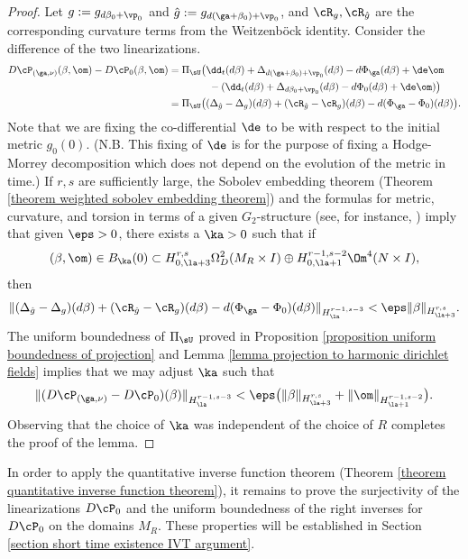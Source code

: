 \documentclass[hidelinks, 12pt, oneside, reqno]{amsart}
\begin{document}
\begin{proof}
Let $g := g_{d\beta_0 + \vp_0}$ and $\hat g := g_{d(\ga + \beta_0) + \vp_0}$, and $\cR_g, \cR_{\hat g}$ are the corresponding curvature terms from the Weitzenb\"ock identity. Consider the difference of the two linearizations. 
\begin{align*}
    D\cP_{(\ga, \nu)}(\beta,\om) -  D\cP_0(\beta,\om)&= \Pi_{\sU} \big( \dd_t (d\beta) + \Delta_{d(\ga + \beta_0) + \vp_0} (d\beta) - d\Phi_\ga (d\beta) + \de \om  \\
    &\qquad \qquad - (\dd_t (d\beta) + \Delta_{d\beta_0 + \vp_0} (d\beta) - d\Phi_0 (d\beta) + \de \om )  \big) \\
    &=  \Pi_{\sU} \big( (\Delta_{\hat g} - \Delta_{g}) (d\beta) + (\cR_{\hat g} - \cR_{g})(d\beta) - d(\Phi_\ga - \Phi_0) (d\beta) \big).  
\end{align*}
Note that we are fixing the co-differential $\de$ to be with respect to the initial metric $g_0(0)$. (N.B. This fixing of $\de$ is for the purpose of fixing a Hodge-Morrey decomposition which does not depend on the evolution of the metric in time.) If $r,s$ are sufficiently large, the Sobolev embedding theorem (Theorem \ref{theorem weighted sobolev embedding theorem}) and the formulas for metric, curvature, and torsion in terms of a given $G_2$-structure (see, for instance, \cite[\S 2]{LotayWeiLaplacianFlow}) imply that given $\eps > 0$, there exists a $\ka >0$ such that if 
\[
(\beta,\om) \in B_\ka(0) \subset H^{r,s}_{0, \la+3} \Omega^2_D (M_R \times I) \oplus H_{0,\la+1}^{r-1,s-2}\Om^4 (N \times I), 
\]
then 
\[
\|(\Delta_{\hat g} - \Delta_{g}) (d\beta) + (\cR_{\hat g} - \cR_{g})(d\beta) - d(\Phi_\ga - \Phi_0) (d\beta) \|_{H^{r-1,s-3}_\la} < \eps \|\beta\|_{H^{r,s}_{\la+3}}.
\]
The uniform boundedness of $\Pi_{\sU}$ proved in Proposition \ref{proposition uniform boundedness of projection} and Lemma \ref{lemma projection to harmonic dirichlet fields} implies that we may adjust $\ka$ such that 
\[
\|(D\cP_{(\ga,\nu)} - D\cP_0) (\beta) \|_{H^{r-1,s-3}_\la} < \eps \big(\|\beta\|_{H^{r,s}_{\la+3}} + \|\om\|_{H^{r-1,s-2}_{\la+1}}\big).
\]
Observing that the choice of $\ka$ was independent of the choice of $R$ completes the proof of the lemma.
\end{proof}

\begin{rmk}
In order to apply the quantitative inverse function theorem (Theorem \ref{theorem quantitative inverse function theorem}), it remains to prove the surjectivity of the linearizations $D \cP_0$ and the uniform boundedness of the right inverses for $D \cP_0$ on the domains $M_R$. These properties will be established in Section \ref{section short time existence IVT argument}.
\end{rmk}
\end{document}
